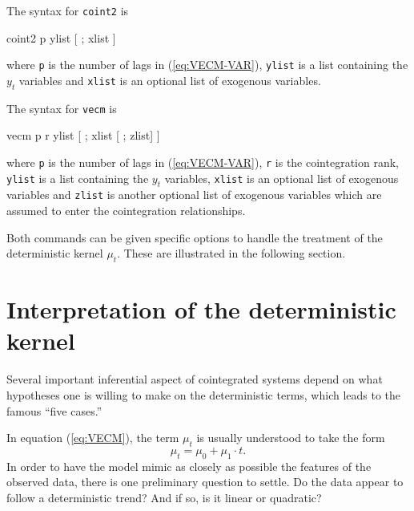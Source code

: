 The syntax for \texttt{coint2} is 
\begin{code}
  coint2 p ylist [ ; xlist ]
\end{code}
where \texttt{p} is the number of lags in (\ref{eq:VECM-VAR}),
\texttt{ylist} is a list containing the $y_t$ variables and
\texttt{xlist} is an optional list of exogenous variables.

The syntax for \texttt{vecm} is 
\begin{code}
  vecm p r ylist [ ; xlist [ ; zlist] ]
\end{code}
where \texttt{p} is the number of lags in (\ref{eq:VECM-VAR}),
\texttt{r} is the cointegration rank, \texttt{ylist} is a list
containing the $y_t$ variables, \texttt{xlist} is an optional list of
exogenous variables and \texttt{zlist} is another optional list of
exogenous variables which are assumed to enter the cointegration
relationships.

Both commands can be given specific options to handle the treatment of
the deterministic kernel $\mu_t$. These are illustrated in the
following section.

\section{Interpretation of the deterministic kernel}
\label{sec:coint-5cases}

Several important inferential aspect of cointegrated systems depend on
what hypotheses one is willing to make on the deterministic terms,
which leads to the famous ``five cases.''

In equation (\ref{eq:VECM}), the term $\mu_t$ is usually understood to
take the form
\[
  \mu_t = \mu_0 + \mu_1 \cdot t .
\]
In order to have the model mimic as closely as possible the features
of the observed data, there is one preliminary question to settle. Do
the data appear to follow a deterministic trend? And if so, is it
linear or quadratic?


